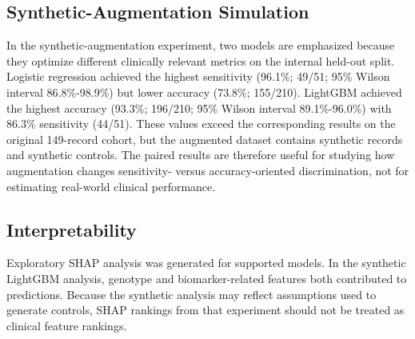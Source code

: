 \documentclass[12pt]{article}
\begin{document}
\begin{table}[ht]
\centering
\caption{Leave-one-study-out grouped validation on the 149-record cohort (pooled out-of-fold predictions), keyed on \texttt{study\_id}. Preprocessing was fit on training folds only.}
\end{table}

\subsection{Synthetic-Augmentation Simulation}
In the synthetic-augmentation experiment, two models are emphasized because they optimize different clinically relevant metrics on the internal held-out split. Logistic regression achieved the highest sensitivity (96.1\%; 49/51; 95\% Wilson interval 86.8\%-98.9\%) but lower accuracy (73.8\%; 155/210). LightGBM achieved the highest accuracy (93.3\%; 196/210; 95\% Wilson interval 89.1\%-96.0\%) with 86.3\% sensitivity (44/51). These values exceed the corresponding results on the original 149-record cohort, but the augmented dataset contains synthetic records and synthetic controls. The paired results are therefore useful for studying how augmentation changes sensitivity- versus accuracy-oriented discrimination, not for estimating real-world clinical performance.

\subsection{Interpretability}
Exploratory SHAP analysis was generated for supported models. In the synthetic LightGBM analysis, genotype and biomarker-related features both contributed to predictions. Because the synthetic analysis may reflect assumptions used to generate controls, SHAP rankings from that experiment should not be treated as clinical feature rankings.
\end{document}
